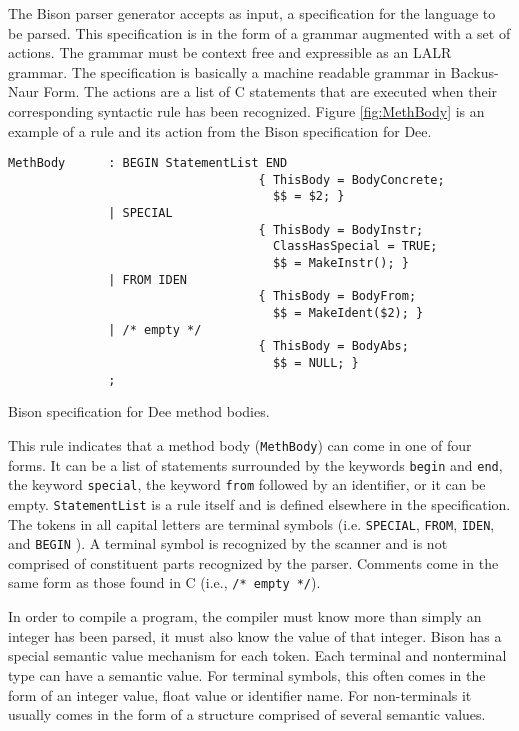 The Bison parser generator accepts as input, a specification for the
language to be parsed.  This specification is in the form of a grammar
augmented with a set of actions.  The grammar must be context free and
expressible as an LALR grammar.  The specification is basically a
machine readable grammar in Backus-Naur Form.  The actions are a list
of C statements that are executed when their corresponding syntactic
rule has been recognized.  Figure \ref{fig:MethBody} is an example of a
rule and its action from the Bison specification for Dee.

\begin{shortfigure}
\begin{verbatim}
MethBody      : BEGIN StatementList END
                                   { ThisBody = BodyConcrete;
                                     $$ = $2; }
              | SPECIAL
                                   { ThisBody = BodyInstr;
                                     ClassHasSpecial = TRUE;
                                     $$ = MakeInstr(); }
              | FROM IDEN
                                   { ThisBody = BodyFrom;
                                     $$ = MakeIdent($2); }
              | /* empty */
                                   { ThisBody = BodyAbs;
                                     $$ = NULL; }
              ;
\end{verbatim}
\caption{Bison specification for Dee method bodies.}
\label{fig:MethBody}
\end{shortfigure}

This rule indicates that a method body ({\tt MethBody}) can come in
one of four forms.  It can be a list of statements surrounded by the
keywords {\tt begin} and {\tt end}, the keyword {\tt special}, the
keyword {\tt from} followed by an identifier, or it can be empty.
{\tt StatementList} is a rule itself and is defined elsewhere in the
specification.  The tokens in all capital letters are terminal symbols
(i.e. {\tt SPECIAL}, {\tt FROM}, {\tt IDEN}, and {\tt BEGIN} ).  A
terminal symbol is recognized by the scanner and is not comprised of
constituent parts recognized by the parser.  Comments come in the same
form as those found in C (i.e., {\tt /* empty */}).

In order to compile a program, the compiler must know more than simply
an integer has been parsed, it must also know the value of that
integer.  Bison has a special semantic value mechanism for each
token.  Each terminal and nonterminal type can have a semantic value.
For terminal symbols, this often comes in the form of an integer
value, float value or identifier name.  For non-terminals it usually
comes in the form of a structure comprised of several semantic values.

